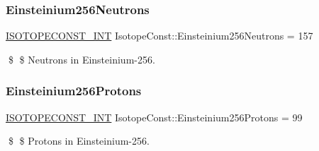 \subsubsection{\texorpdfstring{Einsteinium256\+Neutrons}{Einsteinium256Neutrons}}
{\footnotesize\ttfamily \mbox{\hyperlink{group___isotope_const-_macros_ga5f18360b3e99483a35c32d789e62621c}{I\+S\+O\+T\+O\+P\+E\+C\+O\+N\+S\+T\+\_\+\+I\+NT}} Isotope\+Const\+::\+Einsteinium256\+Neutrons = 157}

\$ \$ Neutrons in Einsteinium-\/256. \mbox{\label{group___isotope_const-_einsteinium-_es256_ga4efcd363bb6db3be6094b151478b035b}} 
\subsubsection{\texorpdfstring{Einsteinium256\+Protons}{Einsteinium256Protons}}
{\footnotesize\ttfamily \mbox{\hyperlink{group___isotope_const-_macros_ga5f18360b3e99483a35c32d789e62621c}{I\+S\+O\+T\+O\+P\+E\+C\+O\+N\+S\+T\+\_\+\+I\+NT}} Isotope\+Const\+::\+Einsteinium256\+Protons = 99}

\$ \$ Protons in Einsteinium-\/256. 